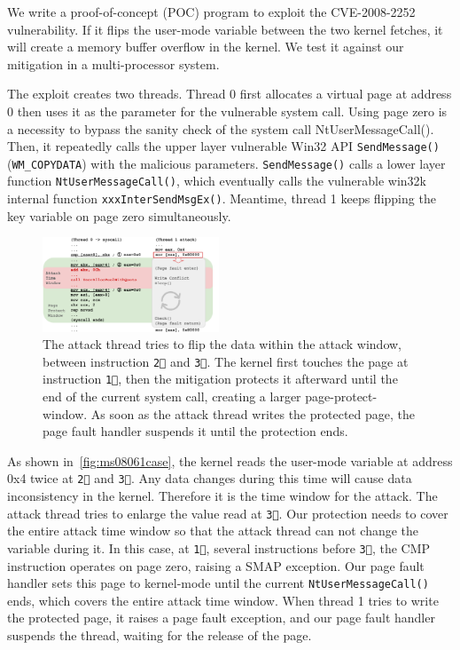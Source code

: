 We write a proof-of-concept (POC) program to exploit the CVE-2008-2252 vulnerability. If it flips the user-mode variable between the two kernel fetches, it will create a memory buffer overflow in the kernel. We test it against our mitigation in a multi-processor system.



The exploit creates two threads. Thread 0 first allocates a virtual page at address 0 then uses it as the parameter for the vulnerable system call. Using page zero is a necessity to bypass the sanity check of the system call NtUserMessageCall(). Then, it repeatedly calls the upper layer vulnerable Win32 API \texttt{SendMessage()} (\texttt{WM\_COPYDATA}) with the malicious parameters. \texttt{SendMessage()} calls a lower layer function \texttt{NtUserMessageCall()}, which eventually calls the vulnerable win32k internal function \texttt{xxxInterSendMsgEx()}. Meantime, thread 1 keeps flipping the key variable on page zero simultaneously.


\begin{figure}[th]
  \includegraphics[width=0.47\textwidth]{figures/ms08061case2}
  \centering
  \caption{The attack thread tries to flip the data within the attack window, between instruction \texttt{\textcircled{2}} and \texttt{\textcircled{3}}. The kernel first touches the page at instruction \texttt{\textcircled{1}}, then the mitigation protects it afterward until the end of the current system call, creating a larger page-protect-window. As soon as the attack thread writes the protected page, the page fault handler suspends it until the protection ends.}
  \label{fig:ms08061case}
\end{figure}


As shown in~\autoref{fig:ms08061case}, the kernel reads the user-mode variable at address 0x4 twice at \texttt{\textcircled{2}} and \texttt{\textcircled{3}}. Any data changes during this time will cause data inconsistency in the kernel. Therefore it is the time window for the attack. The attack thread tries to enlarge the value read at \texttt{\textcircled{3}}. Our protection needs to cover the entire attack time window so that the attack thread can not change the variable during it. In this case, at \texttt{\textcircled{1}}, several instructions before \texttt{\textcircled{3}}, the CMP instruction operates on page zero, raising a SMAP exception. Our page fault handler sets this page to kernel-mode until the current \texttt{NtUserMessageCall()} ends, which covers the entire attack time window. When thread 1 tries to write the protected page, it raises a page fault exception, and our page fault handler suspends the thread, waiting for the release of the page.




